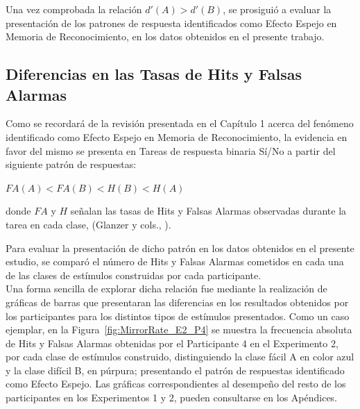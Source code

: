Una vez comprobada la relación $d'(A) > d'(B)$, se prosiguió a evaluar la presentación de los patrones de respuesta identificados como Efecto Espejo en Memoria de Reconocimiento, en los datos obtenidos en el presente trabajo.\\












\subsection{Diferencias en las Tasas de Hits y Falsas Alarmas}

Como se recordará de la revisión presentada en el Capítulo 1 acerca del fenómeno identificado como Efecto Espejo en Memoria de Reconocimiento, la evidencia en favor del mismo se presenta en Tareas de respuesta binaria Sí/No a partir del siguiente patrón de respuestas:\\
 
\begin{center}
$FA(A) < FA(B) < H(B) < H(A)$\\
\end{center}
\begin{center}
donde $FA$ y $H$ señalan las tasas de Hits y Falsas Alarmas observadas durante la tarea en cada clase, (Glanzer y cols., \citeyear{Glanzer1993}).\\
\end{center}

Para evaluar la presentación de dicho patrón en los datos obtenidos en el presente estudio, se comparó el número de Hits y Falsas Alarmas cometidos en cada una de las clases de estímulos construidas por cada participante.\\

Una forma sencilla de explorar dicha relación fue mediante la realización de gráficas de barras que presentaran las diferencias en los resultados obtenidos por los participantes para los distintos tipos de estímulos presentados. Como un caso ejemplar, en la Figura~\ref{fig:MirrorRate_E2_P4} se muestra la frecuencia absoluta de Hits y Falsas Alarmas obtenidas por el Participante 4 en el Experimento 2, por cada clase de estímulos construido, distinguiendo la clase fácil A en color azul y la clase difícil B, en púrpura; presentando el patrón de respuestas identificado como Efecto Espejo. Las gráficas correspondientes al desempeño del resto de los participantes en los Experimentos 1 y 2, pueden consultarse en los Apéndices.\\
\\

